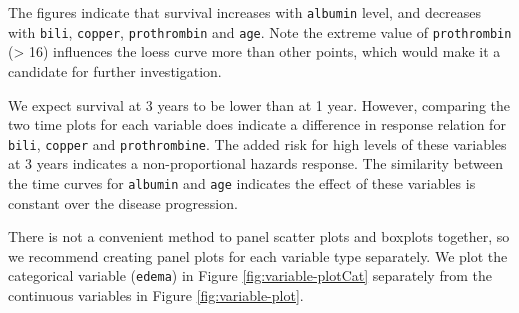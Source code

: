\documentclass[article, nojss]{jss}
\begin{document}
The figures indicate that survival increases with \texttt{albumin}
level, and decreases with \texttt{bili}, \texttt{copper},
\texttt{prothrombin} and \texttt{age}. Note the extreme value of
\texttt{prothrombin} (\textgreater{} 16) influences the loess curve more
than other points, which would make it a candidate for further
investigation.

We expect survival at 3 years to be lower than at 1 year. However,
comparing the two time plots for each variable does indicate a
difference in response relation for \texttt{bili}, \texttt{copper} and
\texttt{prothrombine}. The added risk for high levels of these variables
at 3 years indicates a non-proportional hazards response. The similarity
between the time curves for \texttt{albumin} and \texttt{age} indicates
the effect of these variables is constant over the disease progression.

There is not a convenient method to panel scatter plots and boxplots
together, so we recommend creating panel plots for each variable type
separately. We plot the categorical variable (\texttt{edema}) in Figure
\ref{fig:variable-plotCat} separately from the continuous variables in
Figure \ref{fig:variable-plot}.
\end{document}
